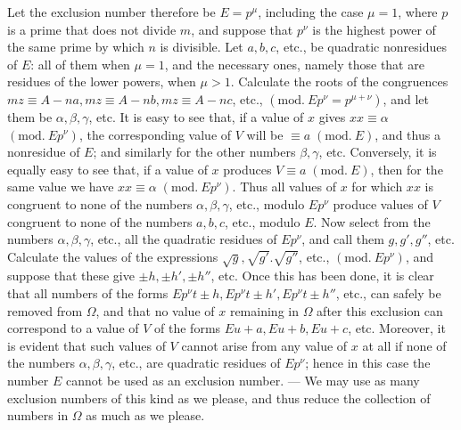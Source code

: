 Let the exclusion number therefore be \(E=p^\mu\), including the case \(\mu=1\), where \(p\) is a prime that does not divide \(m\), and suppose that \(p^\nu\) is the highest power
of the same prime by which \(n\) is divisible. Let \(a,\allowbreak b,\allowbreak c\), etc., be quadratic nonresidues of \(E\): all of them when \(\mu=1\), and the necessary ones, namely those that are residues of the lower powers, when \(\mu>1\). Calculate the roots of the congruences \(mz\equiv A-na,\allowbreak mz\equiv A-nb,\allowbreak mz\equiv A-nc\), etc., \((\mathrm{mod.}\ Ep^\nu=p^{\mu+\nu})\), and let them be \(\alpha,\allowbreak \beta,\allowbreak \gamma\), etc. It is easy to see that, if a value of \(x\) gives \(xx\equiv\alpha\) \((\mathrm{mod.}\ Ep^\nu)\), the corresponding value of \(V\) will be \(\equiv a\; (\mathrm{mod}.\ E)\), and thus a nonresidue of \(E\); and similarly for the other numbers \(\beta,\allowbreak \gamma\), etc. Conversely, it is equally easy to see that, if a value of \(x\) produces \(V\equiv a\; (\mathrm{mod}.\ E)\), then for the same value we have \(xx\equiv\alpha\; (\mathrm{mod}.\ Ep^\nu)\). Thus all values of \(x\) for which \(xx\) is congruent to none of the numbers \(\alpha,\allowbreak \beta,\allowbreak \gamma\), etc., modulo \(Ep^\nu\) produce values of \(V\) congruent to none of the numbers \(a,\allowbreak b,\allowbreak c\), etc., modulo \(E\). Now select from the numbers \(\alpha,\allowbreak \beta,\allowbreak \gamma\), etc., all the quadratic residues of \(Ep^\nu\), and call them \(g,\allowbreak g',\allowbreak g''\), etc. Calculate the values of the expressions \(\surd g,\allowbreak \surd{g'}.\surd{g''}\), etc., \((\mathrm{mod.}\ Ep^\nu)\), and suppose that these give \(\pm h,\allowbreak \pm h',\allowbreak \pm h''\), etc. Once this has been done, it is clear that all numbers of the forms \(Ep^\nu t\pm h,\allowbreak Ep^\nu t\pm h',\allowbreak Ep^\nu t\pm h''\), etc., can safely be removed from \(\Omega\), and that no value of \(x\) remaining in \(\Omega\) after this exclusion can correspond to a value of \(V\) of the forms \(Eu+a,\allowbreak Eu+b,\allowbreak Eu+c\), etc. Moreover, it is evident that such values of \(V\) cannot arise from any value of \(x\) at all if none of the numbers \(\alpha,\allowbreak \beta,\allowbreak \gamma\), etc., are quadratic residues of \(Ep^\nu\); hence in this case the number \(E\) cannot be used as an exclusion number. — We may use as many exclusion numbers of this kind as we please, and thus reduce the collection of numbers in \(\Omega\) as much as we please.

